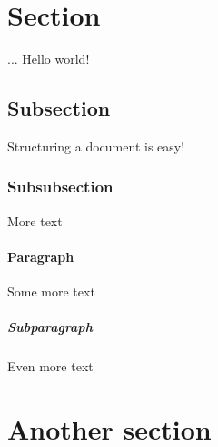 \documentclass{article}
\begin{document}
	\section{Section}...
	Hello world!
	\subsection{Subsection}
	Structuring a document is easy!
	\subsubsection{Subsubsection}
	More text
	\paragraph{Paragraph}
	Some more text\subparagraph{Subparagraph}
	Even more text
	\section{Another section}
\end{document}
